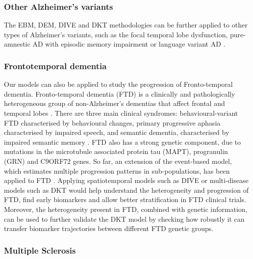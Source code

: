 \subsubsection{Other Alzheimer's variants}

The EBM, DEM, DIVE and DKT methodologies can be further applied to other types of Alzheimer's variants, such as the focal temporal lobe dysfunction, pure-amnestic AD with episodic memory impairment \cite{butters1996focal} or language variant AD \cite{green1990progressive, greene1996alzheimer, galton2000atypical}.

\subsubsection{Frontotemporal dementia}

Our models can also be applied to study the progression of Fronto-temporal dementia. Fronto-temporal dementia (FTD) is a clinically and pathologically heterogeneous group of non-Alzheimer's dementias that affect frontal and temporal lobes \cite{warren2013frontotemporal}. There are three main clinical syndromes: behavioural-variant FTD characterised by behavioural changes, primary progressive aphasia characterised by impaired speech, and semantic dementia, characterised by impaired semantic memory \cite{warren2013frontotemporal}. FTD also has a strong genetic component, due to mutations in the microtubule associated protein tau (MAPT), progranulin (GRN) and C9ORF72 genes. So far, an extension of the event-based model, which estimates multiple progression patterns in sub-populations, has been applied to FTD \cite{young2018uncovering}. Applying spatiotemporal models such as DIVE or multi-disease models such as DKT would help understand the heterogeneity and progression of FTD, find early biomarkers and allow better stratification in FTD clinical trials. Moreover, the heterogeneity present in FTD, combined with genetic information, can be used to further validate the DKT model by checking how robustly it can transfer biomarker trajectories between different FTD genetic groups. 

\subsubsection{Multiple Sclerosis}

